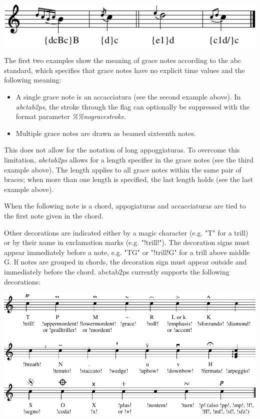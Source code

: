 \documentclass[a4paper]{article}
\begin{document}
\begin{center}
\includegraphics{sample4a}
\end{center}

The first two examples show the meaning of grace notes according to the 
abc standard, which specifies that grace notes have no explicit time values
and the following meaning:
\begin{itemize}
\item A single grace note is an accacciatura
  (see the second example above). In {\em abctab2ps}, the stroke through
  the flag can optionally be suppressed with the format parameter 
  {\em \%\%nogracestroke}.
\item Multiple grace notes are drawn as beamed sixteenth notes.
\end{itemize}
This does not allow for the notation of long appoggiaturas. To overcome this
limitation, {\em abctab2ps} allows for a length specifier in the grace notes
(see the third example above).
The length applies to all grace notes within the same pair of braces; when 
more than one length is specified, the last length holds (see the last example
above).
\par
When the following note is a chord, appogiaturas and accacciaturas
are tied to the first note given in the chord.
\par
Other decorations are indicated either by a magic character (e.g. "T" for a
trill) or by their name in exclamation marks (e.g. "!trill!").
The decoration signs must appear immediately before a note, e.g.
"TG" or "!trill!G" for a trill above middle G. If notes are grouped in chords,
the decoration sign must appear outside and immediately before the chord.
abctab2ps currently supports the following decorations:

\begin{center}
\includegraphics{sample4b}
\end{center}
\end{document}
